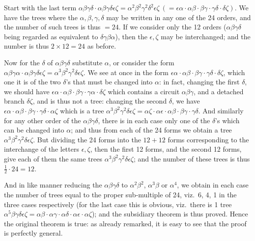 \documentclass[11pt,a4paper]{article}
\begin{document}
\smallskip
Start with the last term $\alpha\beta\gamma\delta \cdot \alpha\beta\gamma\delta\epsilon\zeta = \alpha^2\beta^2\gamma^2\delta^2\epsilon\zeta\ (= \epsilon\alpha \cdot \alpha\beta \cdot \beta\gamma \cdot \gamma\delta \cdot \delta\zeta)$. We have the trees where the $\alpha, \beta, \gamma, \delta$ may be written in any one of the 24 orders, and the number of such trees is thus $= 24$. If we consider only the 12 orders ($\alpha\beta\gamma\delta$ being regarded as equivalent to $\delta\gamma\beta\alpha$), then the $\epsilon, \zeta$ may be interchanged; and the number is thus $2 \times 12 = 24$ as before.

\smallskip
Now for the $\delta$ of $\alpha\beta\gamma\delta$ substitute $\alpha$, or consider the form $\alpha\beta\gamma\alpha \cdot \alpha\beta\gamma\delta\epsilon\zeta = \alpha^3\beta^2\gamma^2\delta\epsilon\zeta$. We see at once in the form $\epsilon\alpha \cdot \alpha\beta \cdot \beta\gamma \cdot \gamma\delta \cdot \delta\zeta$, which one it is of the two $\delta$'s that must be changed into $\alpha$: in fact, changing the first $\delta$, we should have $\epsilon\alpha \cdot \alpha\beta \cdot \beta\gamma \cdot \gamma\alpha \cdot \delta\zeta$ which contains a circuit $\alpha\beta\gamma$, and a detached branch $\delta\zeta$, and is thus not a tree: changing the second $\delta$, we have $\epsilon\alpha \cdot \alpha\beta \cdot \beta\gamma \cdot \gamma\delta \cdot \alpha\zeta$ which is a tree $\alpha^3\beta^2\gamma^2\delta\epsilon\zeta = \alpha\zeta \cdot \alpha\epsilon \cdot \alpha\beta \cdot \beta\gamma \cdot \gamma\delta$. And similarly for any other order of the $\alpha\beta\gamma\delta$, there is in each case only one of the $\delta$'s which can be changed into $\alpha$; and thus from each of the 24 forms we obtain a tree $\alpha^3\beta^2\gamma^2\delta\epsilon\zeta$. But dividing the 24 forms into the $12 + 12$ forms corresponding to the interchange of the letters $\epsilon, \zeta$, then the first 12 forms, and the second 12 forms, give each of them the same trees $\alpha^3\beta^2\gamma^2\delta\epsilon\zeta$; and the number of these trees is thus $\tfrac{1}{2} \cdot 24 = 12$.

\newpage

And in like manner reducing the $\alpha\beta\gamma\delta$ to $\alpha^2\beta^2$, $\alpha^3\beta$ or $\alpha^4$, we obtain in each case the number of trees equal to the proper sub-multiple of 24, viz.\ 6, 4, 1 in the three cases respectively (for the last case this is obvious, viz.\ there is 1 tree $\alpha^5\beta\gamma\delta\epsilon\zeta = \alpha\beta \cdot \alpha\gamma \cdot \alpha\delta \cdot \alpha\epsilon \cdot \alpha\zeta$); and the subsidiary theorem is thus proved. Hence the original theorem is true: as already remarked, it is easy to see that the proof is perfectly general.
\end{document}
